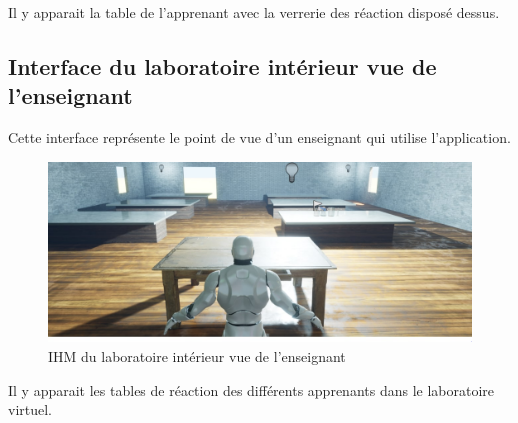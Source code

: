 Il y apparait la table de l'apprenant avec la verrerie des réaction disposé dessus.

\subsection{Interface du laboratoire intérieur vue de l'enseignant}

Cette interface représente le point de vue d'un enseignant qui utilise l'application.

\begin{figure}[H]
	\centering
	\includegraphics[width=1\textwidth]{img/labo3}
	\caption{IHM du laboratoire intérieur vue de l'enseignant}
	\label{fig:mesh1}
\end{figure}

Il y apparait les tables de réaction des différents apprenants dans le laboratoire virtuel.